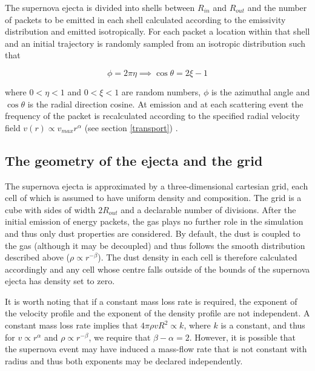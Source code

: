 \documentclass[useAMS,usenatbib,usegraphicx]{mnras}
\begin{document}
The supernova ejecta is divided into shells between $R_{in}$ and $R_{out}$ and the number of packets to be emitted in each shell calculated according to the emissivity distribution and emitted isotropically.  For each packet a location within that shell and an initial trajectory is randomly sampled from an isotropic distribution such that 

\begin{equation}
\phi=2\pi\eta \implies
 \cos \theta=2\xi -1
\end{equation}

\noindent where $0<\eta<1$ and $0<\xi<1$ are random numbers, $\phi$ is the azimuthal angle and $\cos \theta$ is the radial direction cosine.  At emission and at each scattering event the frequency of the packet is recalculated according to the specified radial velocity field $v(r) \propto v_{max}r^{\alpha}$ (see section \ref{transport}) .




\subsection{The geometry of the ejecta and the grid}
\label{grid}
The supernova ejecta is approximated by a three-dimensional cartesian grid, each cell of which is assumed to have uniform density and composition.  The grid is a cube with  sides of width $2R_{out}$ and a declarable number of divisions.  After the initial emission of energy packets, the gas plays no further role in the simulation and thus only dust properties are considered.  By default, the dust is coupled to the gas (although it may be decoupled) and thus follows the smooth distribution described above ($\rho \propto r^{-\beta}$).  The dust density in each cell is therefore calculated accordingly and any cell whose centre falls outside of the bounds of the supernova ejecta has density set to zero.  

It is worth noting that if a constant mass loss rate is required, the exponent of the velocity profile and the exponent of the density profile are not independent.  A constant mass loss rate implies that $4\pi \rho vR^2  \propto k$, where $k$ is a constant, and thus for $v \propto r^\alpha$ and $\rho\propto r^{-\beta}$, we require that $\beta-\alpha=2$.  However,  it is possible that the supernova event may have induced a mass-flow rate that is not constant with radius and thus both exponents may be declared independently.
\end{document}
